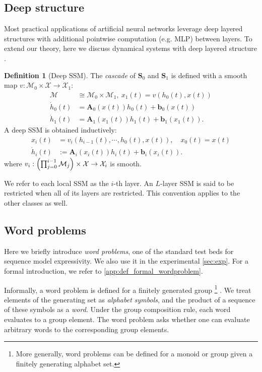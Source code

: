 \documentclass{article}
\theoremstyle{plain}
\theoremstyle{definition}
\newtheorem{definition}[theorem]{Definition}
\theoremstyle{remark}
\newcommand{\mcal}[1]{\mathcal{#1}}
\newcommand{\mbf}[1]{\mathbf{#1}}
\begin{document}
\subsection{Deep structure}
Most practical applications of artificial neural networks leverage deep layered structures with additional pointwise computation (e.g. MLP) between layers. To extend our theory, here we discuss dynamical systems with deep layered structure  \cite{krener1977decomposition}.
\begin{definition}[Deep SSM]
\label{def:stacking}
    The \emph{cascade} of $\mbf{S}_0$ and $\mbf{S}_1$ is
    defined with a smooth map $v: \mcal{M}_0 \times \mcal{X} \to \mcal{X}_1$:
    \begin{align*}
        \mcal{M} &\cong \mcal{M}_0 \times \mcal{M}_1, \: x_1(t) = v(h_0(t), x(t)) \\
        \dot{h}_0(t) &= \mbf{A}_0(x(t))h_0(t) + \mbf{b}_0(x(t)) \\
        \dot{h}_1(t) &= \mbf{A}_1(x_1(t))h_1(t) + \mbf{b}_1(x_1(t)).
    \end{align*}
     A deep SSM is obtained inductively:
     \begin{align*}
        x_i(t) &= v_i(h_{i-1}(t), \cdots, h_0(t), x(t)),
        \quad
        x_0(t) = x(t) \\
        \dot{h}_i(t) &:= \mbf{A}_i(x_i(t)) h_i(t) + \mbf{b}_i(x_i(t)).
     \end{align*}
     where $v_i: \Bigl( \prod_{j=0}^{i-1} \mcal{M}_j \Bigr) \times \mcal{X} \to \mcal{X}_i$ is smooth.

     We refer to each local SSM as the $i$-th layer.
     An $L$-layer SSM is said to be restricted when all of its layers are restricted.
     This convention applies to the other classes as well.
\end{definition}
\subsection{Word problems}
\label{sec:intro_word_problems}
Here we briefly introduce \emph{word problems}, one of the standard test beds for sequence model expressivity.
We also use it in the experimental \cref{sec:exp}.
For a formal introduction, we refer to \cref{app:def_formal_wordproblem}.

Informally, a word problem is defined for a finitely generated group
\footnote{More generally, word problems can be defined for a monoid or group given a finitely generating alphabet set.}
\cite{liu2022transformers, merrill2024illusion}.
We treat elements of the generating set as \emph{alphabet symbols},
and the product of a sequence of these symbols as a \emph{word}.
Under the group composition rule, each word evaluates to a group element.
The word problem asks whether one can evaluate arbitrary words to the corresponding group elements.
\end{document}
